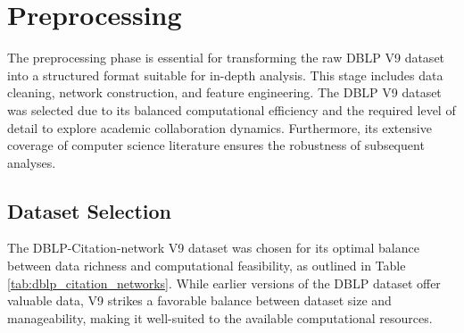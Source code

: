 \documentclass[11pt]{article}
\begin{document}
\section{Preprocessing}

The preprocessing phase is essential for transforming the raw DBLP V9 dataset into a structured format suitable for in-depth analysis. This stage includes data cleaning, network construction, and feature engineering. The DBLP V9 dataset was selected due to its balanced computational efficiency and the required level of detail to explore academic collaboration dynamics. Furthermore, its extensive coverage of computer science literature ensures the robustness of subsequent analyses.

\subsection{Dataset Selection}

The DBLP-Citation-network V9 dataset was chosen for its optimal balance between data richness and computational feasibility, as outlined in Table \ref{tab:dblp_citation_networks}. While earlier versions of the DBLP dataset offer valuable data, V9 strikes a favorable balance between dataset size and manageability, making it well-suited to the available computational resources.
\end{document}
